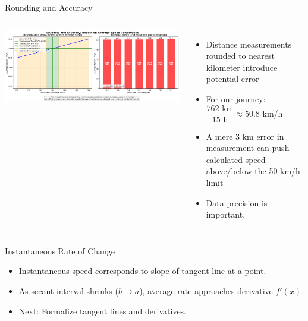 \documentclass{beamer}
\begin{document}
\begin{frame}{Rounding and Accuracy}
  \begin{columns}
      \includegraphics[width=\textwidth]{figures/rounding_accuracy_demo.png}
      \begin{itemize}
        \item Distance measurements rounded to nearest kilometer introduce potential error
        \item For our journey: $\dfrac{762\text{ km}}{15\text{ h}} \approx 50.8$ km/h
        \item A mere 3 km error in measurement can push calculated speed above/below the 50 km/h limit
        \item Data precision is important.
      \end{itemize}
  \end{columns}
\end{frame}

\begin{frame}{Instantaneous Rate of Change}
  \begin{itemize}
    \item Instantaneous speed corresponds to slope of tangent line at a point.
    \item As secant interval shrinks ($b\to a$), average rate approaches derivative $f'(x)$.
    \item Next: Formalize tangent lines and derivatives.
  \end{itemize}
\end{frame}
\end{document}
